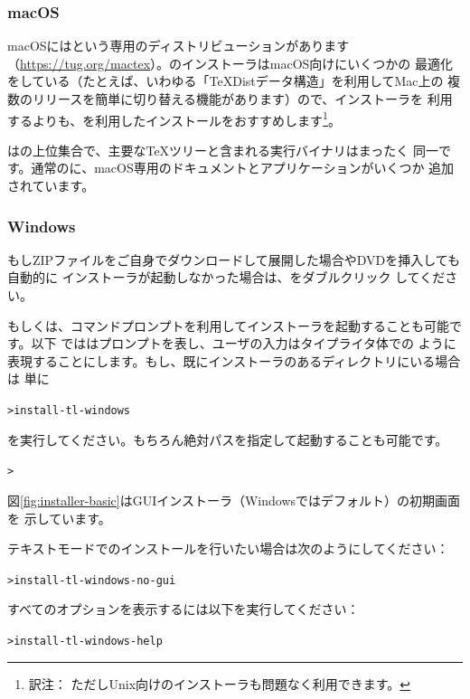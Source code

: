 \documentclass[uplatex,dvipdfmx,12pt,tombow]{jsarticle}
\begin{document}
\subsubsection{macOS}
\label{sec:macos}

macOSには\MacTeX という専用のディストリビューションがあります
（\url{https://tug.org/mactex}）。\MacTeX のインストーラはmacOS向けにいくつかの
最適化をしている（たとえば、いわゆる「{\TeX}Distデータ構造」を利用してMac上の
複数の\TL リリースを簡単に切り替える機能があります）ので、\TL インストーラを
利用するよりも、\MacTeX を利用したインストールをおすすめします\footnote{訳注：
ただしUnix向けの\TL インストーラも問題なく利用できます。}。

\MacTeX は\TL の上位集合で、主要な\TeX ツリーと含まれる実行バイナリはまったく
同一です。通常の\TL に、macOS専用のドキュメントとアプリケーションがいくつか
追加されています。

\subsubsection{Windows}\label{sec:wininst}

もしZIPファイルをご自身でダウンロードして展開した場合やDVDを挿入しても自動的に
インストーラが起動しなかった場合は、をダブルクリック
してください。

もしくは、コマンドプロンプトを利用してインストーラを起動することも可能です。以下
では\code{>}はプロンプトを表し、ユーザの入力はタイプライタ体での
ように表現することにします。もし、既にインストーラのあるディレクトリにいる場合は
単に
%
\begin{alltt}
> install-tl-windows
\end{alltt}
%
を実行してください。もちろん絶対パスを指定して起動することも可能です。
%
\begin{alltt}
> 
\end{alltt}
%
図\ref{fig:installer-basic}はGUIインストーラ（Windowsではデフォルト）の初期画面を
示しています。

テキストモードでのインストールを行いたい場合は次のようにしてください：
%
\begin{alltt}
> install-tl-windows -no-gui
\end{alltt}

すべてのオプションを表示するには以下を実行してください：
%
\begin{alltt}
> install-tl-windows -help
\end{alltt}
\end{document}
